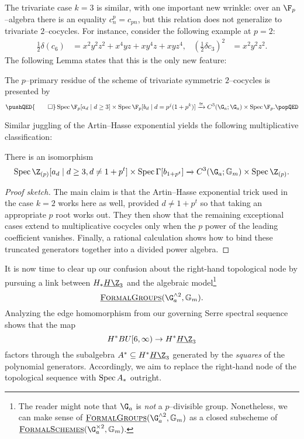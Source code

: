 The trivariate case \(k = 3\) is similar, with one important new wrinkle: over an \(\F_p\)--algebra there is an equality \(c_n^p = c_{pn}\), but this relation does not generalize to trivariate \(2\)--cocycles.  For instance, consider the following example at \(p = 2\):
\begin{align*}
\frac{1}{2} \delta (c_6) & = x^2 y^2 z^2 + x^4 y z + x y^4 z + x y z^4, &
\left(\frac{1}{2} \delta c_3\right)^2 & = x^2 y^2 z^2.
\end{align*}
The following Lemma states that this is the only new feature:
\begin{lemma}
The \(p\)--primary residue of the scheme of trivariate symmetric \(2\)--cocycles is presented by
\[\pushQED{\qed}
\Spec \F_p[a_d \mid d \ge 3] \times \Spec \F_p[b_d \mid d = p^j(1 + p^k)] \xrightarrow{\cong} C^3(\G_a; \G_a) \times \Spec \F_p. \qedhere
\popQED\]
\end{lemma}

\noindent Similar juggling of the Artin--Hasse exponential yields the following multiplicative classification:
\begin{theorem}\label{AHSCalculationOfC3}
There is an isomorphism \[\Spec \Z_{(p)}[a_d \mid d \ge 3, d \ne 1 + p^t] \times \Spec \Gamma[b_{1 + p^t}] \xrightarrow{} C^3(\G_a; \Gm) \times \Spec \Z_{(p)}.\]
\end{theorem}
\begin{proof}[Proof sketch]
The main claim is that the Artin--Hasse exponential trick used in the case \(k = 2\) works here as well, provided \(d \ne 1 + p^t\) so that taking an appropriate \(p\){\th} root works out.  They then show that the remaining exceptional cases extend to multiplicative cocycles only when the \(p\){\th} power of the leading coefficient vanishes.  Finally, a rational calculation shows how to bind these truncated generators together into a divided power algebra.
\end{proof}

It is now time to clear up our confusion about the right-hand topological node by pursuing a link between \(H_* \OS{H\Z}{3}\) and the algebraic model\footnote{The reader might note that \(\G_a\) is \emph{not} a \(p\)--divisible group.  Nonetheless, we can make sense of \(\InternalHom{FormalGroups}(\G_a^{\sm 2}, \Gm)\) as a closed subscheme of \(\InternalHom{FormalSchemes}(\G_a^{\times 2}, \Gm)\).} \[\InternalHom{FormalGroups}(\G_a^{\sm 2}, \Gm).\]  Analyzing the edge homomorphism from our governing Serre spectral sequence shows that the map \[H^* BU[6, \infty) \to H^* \OS{H\Z}{3}\] factors through the subalgebra \(A^* \subseteq H^* \OS{H\Z}{3}\) generated by the \emph{squares} of the polynomial generators.  Accordingly, we aim to replace the right-hand node of the topological sequence with \(\operatorname{Spec} A_*\) outright.

